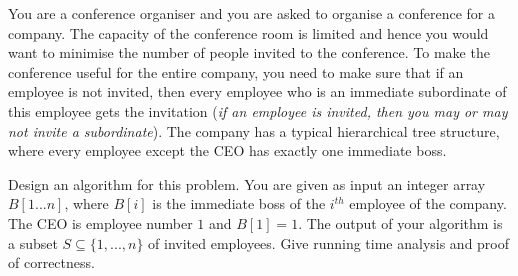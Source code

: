 \documentclass[answers]{exam}
\begin{document}
\begin{questions}
\vspace{0.4in}

\question[25] You are a conference organiser and you are asked to organise a conference for a company. 
The capacity of the conference room is limited and hence you would want to minimise the number of people invited to the conference.
To make the conference useful for the entire company, you need to make sure that if an employee is not invited, then every employee who is an immediate subordinate of this employee gets the invitation
({\it if an employee is invited, then you may or may not invite a subordinate}).
The company has a typical hierarchical tree structure, where every employee except the CEO has exactly one immediate boss.

Design an algorithm for this problem. You are given as input an integer array $B[1...n]$, where $B[i]$ is the immediate boss of the $i^{th}$ employee of the company. The CEO is employee number $1$ and $B[1]=1$. The output of your algorithm is a subset $S \subseteq \{1, ..., n\}$ of invited employees. 
Give running time analysis and proof of correctness.

\begin{solution}



\end{solution}
\end{questions}
\end{document}
